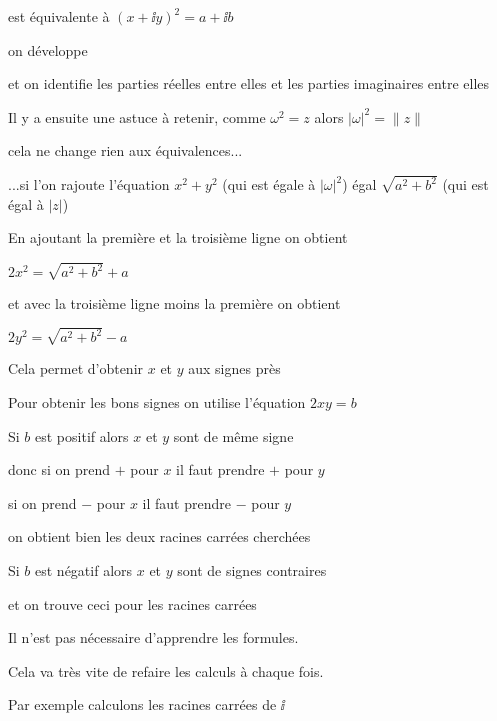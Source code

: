 \change

est équivalente à $\left( x + \ii y \right)^2 = a + \ii b$

\change

on développe 

 et on identifie les parties réelles entre elles et les parties imaginaires entre elles

\change

Il y a ensuite une astuce à retenir, comme
$\omega^2=z$ alors  $|\omega|^2 = \|z\|$ 

cela ne change rien aux équivalences...

\change

...si l'on rajoute l'équation
$x^2+y^2$ (qui est égale à $|\omega|^2$) 
égal $\sqrt{a^2+b^2}$ (qui est égal à $|z|$)

\change

En ajoutant la première et la troisième ligne on obtient 

$2 x^2 = \sqrt{a^2 + b^2} + a$

et avec la troisième ligne moins la première on obtient

$2 y^2 = \sqrt{a^2 + b^2} - a$

\change

Cela permet d'obtenir $x$ et $y$ aux signes près

\change

Pour obtenir les bons signes on utilise l'équation
$2xy=b$

\change

Si $b$ est positif alors $x$ et $y$ sont de même signe

donc si on prend $+$ pour $x$ il faut prendre $+$ pour $y$

si on prend $-$ pour $x$ il faut prendre $-$ pour $y$

on obtient bien les deux racines carrées cherchées

\change

Si $b$ est négatif alors $x$ et $y$ sont de signes contraires

et on trouve ceci pour les racines carrées




\diapo

Il n'est pas nécessaire d'apprendre les formules.

Cela va très vite de refaire les calculs à chaque fois.

Par exemple calculons les racines carrées de $\ii$

